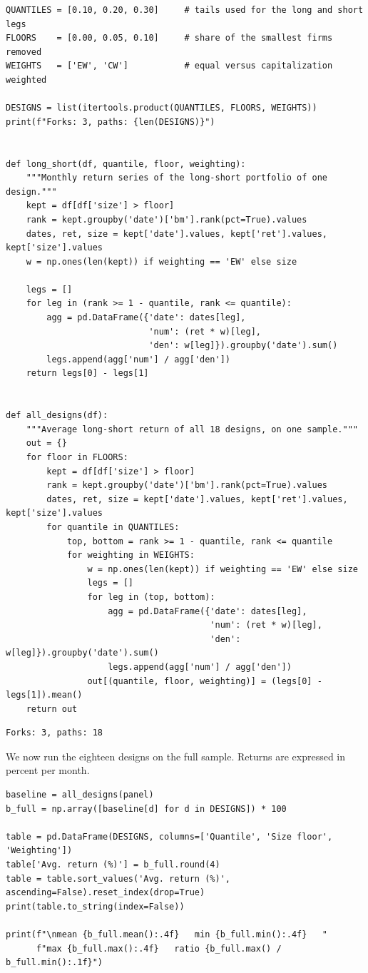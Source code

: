 \begin{verbatim}
QUANTILES = [0.10, 0.20, 0.30]     # tails used for the long and short legs
FLOORS    = [0.00, 0.05, 0.10]     # share of the smallest firms removed
WEIGHTS   = ['EW', 'CW']           # equal versus capitalization weighted

DESIGNS = list(itertools.product(QUANTILES, FLOORS, WEIGHTS))
print(f"Forks: 3, paths: {len(DESIGNS)}")


def long_short(df, quantile, floor, weighting):
    """Monthly return series of the long-short portfolio of one design."""
    kept = df[df['size'] > floor]
    rank = kept.groupby('date')['bm'].rank(pct=True).values
    dates, ret, size = kept['date'].values, kept['ret'].values, kept['size'].values
    w = np.ones(len(kept)) if weighting == 'EW' else size

    legs = []
    for leg in (rank >= 1 - quantile, rank <= quantile):
        agg = pd.DataFrame({'date': dates[leg],
                            'num': (ret * w)[leg],
                            'den': w[leg]}).groupby('date').sum()
        legs.append(agg['num'] / agg['den'])
    return legs[0] - legs[1]


def all_designs(df):
    """Average long-short return of all 18 designs, on one sample."""
    out = {}
    for floor in FLOORS:
        kept = df[df['size'] > floor]
        rank = kept.groupby('date')['bm'].rank(pct=True).values
        dates, ret, size = kept['date'].values, kept['ret'].values, kept['size'].values
        for quantile in QUANTILES:
            top, bottom = rank >= 1 - quantile, rank <= quantile
            for weighting in WEIGHTS:
                w = np.ones(len(kept)) if weighting == 'EW' else size
                legs = []
                for leg in (top, bottom):
                    agg = pd.DataFrame({'date': dates[leg],
                                        'num': (ret * w)[leg],
                                        'den': w[leg]}).groupby('date').sum()
                    legs.append(agg['num'] / agg['den'])
                out[(quantile, floor, weighting)] = (legs[0] - legs[1]).mean()
    return out
\end{verbatim}

\begin{verbatim}
Forks: 3, paths: 18
\end{verbatim}

We now run the eighteen designs on the full sample. Returns are expressed in percent per month.

\begin{verbatim}
baseline = all_designs(panel)
b_full = np.array([baseline[d] for d in DESIGNS]) * 100

table = pd.DataFrame(DESIGNS, columns=['Quantile', 'Size floor', 'Weighting'])
table['Avg. return (%)'] = b_full.round(4)
table = table.sort_values('Avg. return (%)', ascending=False).reset_index(drop=True)
print(table.to_string(index=False))

print(f"\nmean {b_full.mean():.4f}   min {b_full.min():.4f}   "
      f"max {b_full.max():.4f}   ratio {b_full.max() / b_full.min():.1f}")
\end{verbatim}

